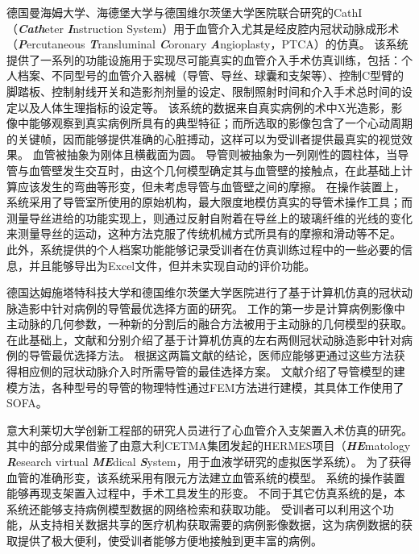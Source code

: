 德国曼海姆大学、海德堡大学与德国维尔茨堡大学医院联合研究的CathI（\textbf{\textit{Cath}}eter \textbf{\textit{I}}nstruction System）用于血管介入尤其是经皮腔内冠状动脉成形术（\textbf{\textit{P}}ercutaneous \textbf{\textit{T}}ransluminal \textbf{\textit{C}}oronary \textbf{\textit{A}}ngioplasty，PTCA）的仿真\cite{rebholz2004cathi}\cite{Hoefer2002CathI}。
该系统提供了一系列的功能设施用于实现尽可能真实的血管介入手术仿真训练\cite{rebholz2004cathi}，包括：个人档案、不同型号的血管介入器械（导管、导丝、球囊和支架等）、控制C型臂的脚踏板、控制射线开关和造影剂剂量的设定、限制照射时间和介入手术总时间的设定以及人体生理指标的设定等。
该系统的数据来自真实病例的术中X光造影，影像中能够观察到真实病例所具有的典型特征；而所选取的影像包含了一个心动周期的关键帧，因而能够提供准确的心脏搏动，这样可以为受训者提供最真实的视觉效果。
血管被抽象为刚体且横截面为圆\cite{Hoefer2002CathI}。
导管则被抽象为一列刚性的圆柱体，当导管与血管壁发生交互时，由这个几何模型确定其与血管壁的接触点，在此基础上计算应该发生的弯曲等形变，但未考虑导管与血管壁之间的摩擦\cite{rebholz2004cathi}。
在操作装置上，系统采用了导管室所使用的原始机构，最大限度地模仿真实的导管术操作工具；而测量导丝进给的功能实现上，则通过反射自附着在导丝上的玻璃纤维的光线的变化来测量导丝的运动，这种方法克服了传统机械方式所具有的摩擦和滑动等不足\cite{Hoefer2002CathI}。
此外，系统提供的个人档案功能能够记录受训者在仿真训练过程中的一些必要的信息，并且能够导出为Excel文件，但并未实现自动的评价功能\cite{rebholz2004cathi}。

德国达姆施塔特科技大学和德国维尔茨堡大学医院进行了基于计算机仿真的冠状动脉造影中针对病例的导管最优选择方面的研究\cite{Rahman2012Darmstadt}\cite{Rahman2011bDarmstadt}\cite{Rahman2011aDarmstadt}\cite{Flehmann2011Darmstadt}。
工作的第一步是计算病例影像中主动脉的几何参数，一种新的分割后的融合方法被用于主动脉的几何模型的获取\cite{Flehmann2011Darmstadt}。
在此基础上，文献\cite{Rahman2011bDarmstadt}和\cite{Rahman2011aDarmstadt}分别介绍了基于计算机仿真的左右两侧冠状动脉造影中针对病例的导管最优选择方法。
根据这两篇文献的结论，医师应能够更通过这些方法获得相应侧的冠状动脉介入时所需导管的最佳选择方案。
文献\cite{Rahman2012Darmstadt}介绍了导管模型的建模方法，各种型号的导管的物理特性通过FEM方法进行建模，其具体工作使用了SOFA\cite{Allard2007SOFA}。

意大利莱切大学创新工程部的研究人员进行了心血管介入支架置入术仿真的研究\cite{aloisio2006HERMES}\cite{aloisio2006aHERMES}\cite{aloisio2005HERMES}\cite{aloisio2004HERMES}。
其中的部分成果借鉴了由意大利CETMA集团发起的HERMES项目（\textbf{\textit{HE}}matology \textbf{\textit{R}}esearch virtual \textbf{\textit{ME}}dical \textbf{\textit{S}}ystem，用于血液学研究的虚拟医学系统）\cite{aloisio2005HERMES}。
为了获得血管的准确形变，该系统采用有限元方法建立血管系统的模型\cite{aloisio2004HERMES}。
系统的操作装置能够再现支架置入过程中，手术工具发生的形变\cite{aloisio2005HERMES}。
不同于其它仿真系统的是，本系统还能够支持病例模型数据的网络检索和获取功能\cite{aloisio2006aHERMES}\cite{aloisio2006HERMES}。
受训者可以利用这个功能，从支持相关数据共享的医疗机构获取需要的病例影像数据，这为病例数据的获取提供了极大便利，使受训者能够方便地接触到更丰富的病例。

